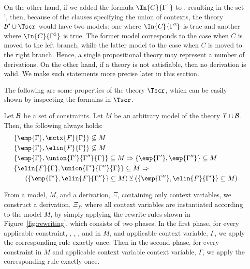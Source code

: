 On the other hand, if we added the formula $\In{C}{\Gamma^1}$ to
\groundSet,
resulting in the set \groundSet', then, because of the clauses specifying
the union of contexts, the theory $\groundSet' \cup
\thSeq$ would have two models: one where $\In{C}{\Gamma^2}$ is true and
another where $\In{C}{\Gamma^3}$ is true. The former model corresponds
to the case when $C$ is moved to the left branch, while the latter model
to the case when $C$ is moved to the right branch. Hence, a single
propositional theory may represent a number of derivations. On the other
hand, if a theory is not satisfiable, then no derivation is valid.
We make such statements more precise later in this section.

The following are some properties of the theory $\thSeq$, which can be
easily shown by inspecting the formulas in $\thSeq$.

\vspace{-2mm}
\begin{proposition}
\label{lemma:crit_pairs}
Let $\mathcal{B}$ be a set of constraints. Let $M$ be an arbitrary model of
the theory $T \cup
\mathcal{B}$. Then, the following always holds:
\begin{align}
&\{ \emp{\Gamma}, \mctx{F}{\Gamma} \} \not\subseteq M \label{em} \\
&\{ \emp{\Gamma}, \elin{F}{\Gamma} \} \not\subseteq M \label{ee} \\
&\{ \emp{\Gamma}, \union{\Gamma'}{\Gamma''}{\Gamma} \} \subseteq M
\Rightarrow \{ 
    \emp{\Gamma'}, \emp{\Gamma''} \} \subseteq M \label{eu} \\
&\{ \elin{F}{\Gamma}, \union{\Gamma'}{\Gamma''}{\Gamma} \} \subseteq M
\Rightarrow \nonumber \\ 
& \quad ~~ (\{ \emp{\Gamma'}, \elin{F}{\Gamma''} \} \subseteq M) \xor
(\{ \emp{\Gamma''}, \elin{F}{\Gamma'} \} \subseteq M) \label{elun}
\end{align}
\end{proposition}

From a model, $M$, and a derivation, $\Xi$, containing only context
variables, we construct a derivation, $\Xi_f$, where all context variables
are instantiated according to the model $M$, by simply applying the
rewrite rules shown in Figure~\ref{fig:rewriting}, which consists of two
phases. In the first phase, for every applicable constraint, ,
, , and  in $M$, and applicable context
variable, $\Gamma$, we apply the corresponding rule exactly once. 
Then in the second phase, for every  constraint in $M$ and
applicable context variable context variable, $\Gamma$, we apply the
corresponding rule exactly once. 

